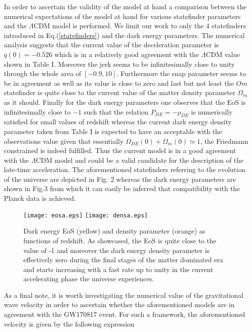 \documentclass[aps,prd,twocolumn,groupedaddress,showpacs,nofootinbib,amssymb]{revtex4-2}
\begin{document}
In order to ascertain the validity of the model at hand a comparison between the numerical expectations of the model at hand for various statefinder parameters and the $\Lambda$CDM model \cite{Aghanim:2018eyx} is performed. We limit our work to only the 4 statefinders introduced in Eq.(\ref{statefinders}) and the dark energy parameters. The numerical analysis suggests that the current value of the deceleration parameter is $q(0)=-0.526$ which is in a relatively good agreement with the $\Lambda$CDM value shown in Table I. Moreover the jerk seems to be infinitesimally close to unity through the whole area of $[-0.9,10]$. Furthermore the snap parameter seems to be in agreement as well as its value is close to zero and last but not least the $Om$ statefinder is quite close to the current value of the matter density parameter $\Omega_m$ as it should. Finally for the dark energy parameters one observes that the EoS is infinitesimally close to $-1$ such that the relation $P_{DE}=-\rho_{DE}$ is numerically satisfied for small values of redshift  whereas the current dark energy density parameter taken from Table I is expected to have an acceptable with the observations value given that essentially $\Omega_{DE}(0)+\Omega_{m}(0)\simeq1$, the Friedmann constrained is indeed fulfilled. Thus the current model is in a good agreement with the $\Lambda$CDM model and could be a valid candidate for the description of the late-time acceleration. The aforementioned statefinders referring to the evolution of the universe are depicted in Fig. 2 whereas the dark energy parameters are shown in Fig.3 from which it can easily be inferred that compatibility with the Planck data \cite{Aghanim:2018eyx} is achieved.

\begin{figure}[h!]
\centering
\label{plot3}
\texttt{[image: eosa.eps]}
\texttt{[image: densa.eps]}
\caption{Dark energy EoS (yellow) and density parameter (orange) as functions of redshift. As showcased, the EoS is quite close to the value of -1 and moreover the dark energy density parameter is effectively zero during the final stages of the matter dominated era and starts increasing with a fast rate up to unity in the current accelerating phase the universe experiences.}
\end{figure}




As a final note, it is worth investigating the numerical value of the gravitational wave velocity in order to ascertain whether the aforementioned models are in agreement with the GW170817 event. For such a framework, the aforementioned velocity is given by the following expression
\end{document}
